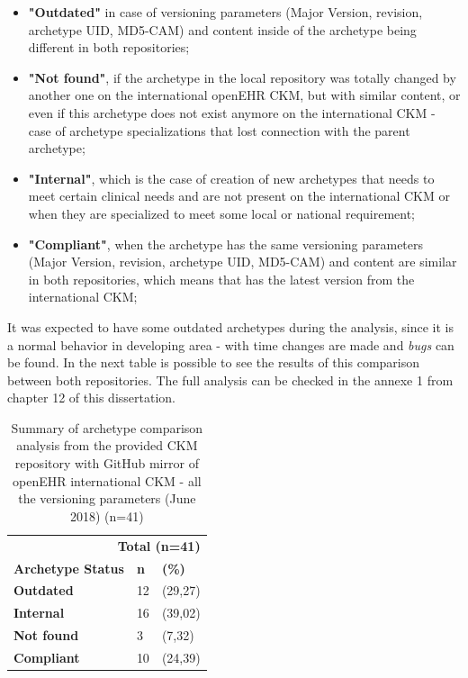 \documentclass[mim_thesis.tex]{subfiles}
\begin{document}
\begin{itemize}[noitemsep]
\item \textbf{"Outdated"} in case of versioning parameters (Major Version, revision, archetype UID, MD5-CAM) and content inside of the archetype being different in both repositories;
\item \textbf{"Not found"}, if the archetype in the local repository was totally changed by another one on the international openEHR CKM, but with similar content, or even if this archetype does not exist anymore on the international CKM - case of archetype specializations that lost connection with the parent archetype;
\item \textbf{"Internal"}, which is the case of creation of new archetypes that needs to meet certain clinical needs and are not present on the international CKM or when they are specialized to meet some local or national requirement;
\item \textbf{"Compliant"}, when the archetype has the same versioning parameters (Major Version, revision, archetype UID, MD5-CAM) and content are similar in both repositories, which means that has the latest version from the international CKM;
\end{itemize}

It was expected to have some outdated archetypes during the analysis, since it is a normal behavior in developing area - with time changes are made and \textit{bugs} can be found. In the next table is possible to see the results of this comparison between both repositories. The full analysis can be checked in the annexe 1 from chapter 12 of this dissertation.

\begin{table}[H]
	\centering
	\caption{Summary of archetype comparison analysis from the provided CKM repository with GitHub mirror of openEHR international CKM - all the versioning parameters (June 2018) (n=41)}
	\label{tab:repos_comp}
	\begin{tabular}{lll}
		\toprule[2pt]
		\multicolumn{3}{r}{\textbf{ Total (n=41) }} \\
		\cmidrule(r){2-3}
		\textbf{Archetype Status}   & \textbf{n} & \textbf{(\%)} \\
		\midrule[2pt]
		\textbf{Outdated } & 12 & (29,27) \\
		\midrule
		\textbf{Internal } & 16 & (39,02) \\
		\midrule
		\textbf{Not found } & 3 & (7,32) \\
        \midrule
		\textbf{Compliant } & 10 & (24,39) \\
		\bottomrule[2pt]
	\end{tabular}
\end{table}
\end{document}
